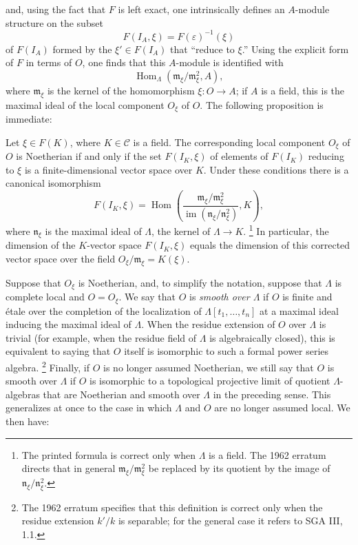 and, using the fact that $F$ is left exact, one intrinsically defines an
$A$-module structure on the subset
\[
  F(I_A,\xi)=F(\varepsilon)^{-1}(\xi)
\]
of $F(I_A)$ formed by the $\xi'\in F(I_A)$ that “reduce to $\xi$.” Using the
explicit form of $F$ in terms of $O$, one finds that this $A$-module is
identified with
\[
  \operatorname{Hom}_{\Lambda}(\mathfrak m_\xi/\mathfrak m_\xi^2,A),
\]
where $\mathfrak m_\xi$ is the kernel of the homomorphism
$\xi:O\longrightarrow A$; if $A$ is a field, this is the maximal ideal of the
local component $O_\xi$ of $O$. The following proposition is immediate:

 Let $\xi\in F(K)$, where $K\in\mathcal C$ is a
field. The corresponding local component $O_\xi$ of $O$ is Noetherian if and
only if the set $F(I_K,\xi)$ of elements of $F(I_K)$ reducing to $\xi$ is a
finite-dimensional vector space over $K$. Under these conditions there is a
canonical isomorphism
\[
  F(I_K,\xi)=
  \operatorname{Hom}\!\left(
    \frac{\mathfrak m_\xi/\mathfrak m_\xi^2}
         {\operatorname{im}(\mathfrak n_\xi/\mathfrak n_\xi^2)},K
  \right),
\]
where $\mathfrak n_\xi$ is the maximal ideal of $\Lambda$, the kernel of
$\Lambda\longrightarrow K$.
\footnote{The printed formula is correct only when $\Lambda$ is a field. The
1962 erratum directs that in general
$\mathfrak m_\xi/\mathfrak m_\xi^2$ be replaced by its quotient by the image
of $\mathfrak n_\xi/\mathfrak n_\xi^2$.}
In particular, the dimension of the $K$-vector space $F(I_K,\xi)$ equals the
dimension of this corrected vector space over the field
$O_\xi/\mathfrak m_\xi=K(\xi)$.

Suppose that $O_\xi$ is Noetherian, and, to simplify the notation, suppose
that $\Lambda$ is complete local and $O=O_\xi$. We say that $O$ is
\emph{smooth over $\Lambda$} if $O$ is finite and étale over the completion of
the localization of $\Lambda[t_1,\ldots,t_n]$ at a maximal ideal inducing the
maximal ideal of $\Lambda$. When the residue extension of $O$ over $\Lambda$
is trivial (for example, when the residue field of $\Lambda$ is algebraically
closed), this is equivalent to saying that $O$ itself is isomorphic to such a
formal power series algebra.
\footnote{The 1962 erratum specifies that this definition is correct only when
the residue extension $k'/k$ is separable; for the general case it refers to
SGA III, 1.1.}
Finally, if $O$ is no longer assumed Noetherian, we still say that $O$ is
smooth over $\Lambda$ if $O$ is isomorphic to a topological projective limit
of quotient $\Lambda$-algebras that are Noetherian and smooth over $\Lambda$
in the preceding sense. This generalizes at once to the case in which
$\Lambda$ and $O$ are no longer assumed local. We then have:

